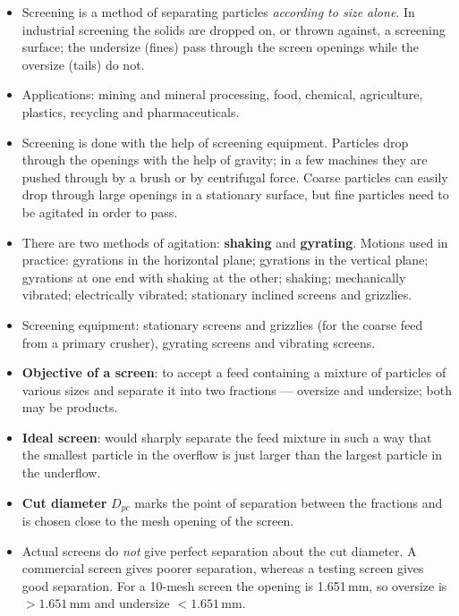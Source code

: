 \documentclass[10pt,a4paper]{article}
\newcommand{\spsub}[1]{\par\addvspace{7pt}\noindent{\color{accent}\bfseries #1}\par\addvspace{3pt}\nopagebreak}
\begin{document}
\spsub{Screening}
\begin{itemize}
  \item Screening is a method of separating particles \emph{according to size alone}. In industrial screening the solids are dropped on, or thrown against, a screening surface; the undersize (fines) pass through the screen openings while the oversize (tails) do not.
  \item Applications: mining and mineral processing, food, chemical, agriculture, plastics, recycling and pharmaceuticals.
  \item Screening is done with the help of screening equipment. Particles drop through the openings with the help of gravity; in a few machines they are pushed through by a brush or by centrifugal force. Coarse particles can easily drop through large openings in a stationary surface, but fine particles need to be agitated in order to pass.
  \item There are two methods of agitation: \textbf{shaking} and \textbf{gyrating}. Motions used in practice: gyrations in the horizontal plane; gyrations in the vertical plane; gyrations at one end with shaking at the other; shaking; mechanically vibrated; electrically vibrated; stationary inclined screens and grizzlies.
  \item Screening equipment: stationary screens and grizzlies (for the coarse feed from a primary crusher), gyrating screens and vibrating screens.
\end{itemize}

\spsub{Ideal and actual screens}
\begin{itemize}
  \item \textbf{Objective of a screen}: to accept a feed containing a mixture of particles of various sizes and separate it into two fractions --- oversize and undersize; both may be products.
  \item \textbf{Ideal screen}: would sharply separate the feed mixture in such a way that the smallest particle in the overflow is just larger than the largest particle in the underflow.
  \item \textbf{Cut diameter} $D_{pc}$ marks the point of separation between the fractions and is chosen close to the mesh opening of the screen.
  \item Actual screens do \emph{not} give perfect separation about the cut diameter. A commercial screen gives poorer separation, whereas a testing screen gives good separation. For a 10-mesh screen the opening is 1.651\,mm, so oversize is $>1.651$\,mm and undersize $<1.651$\,mm.
\end{itemize}
\end{document}
